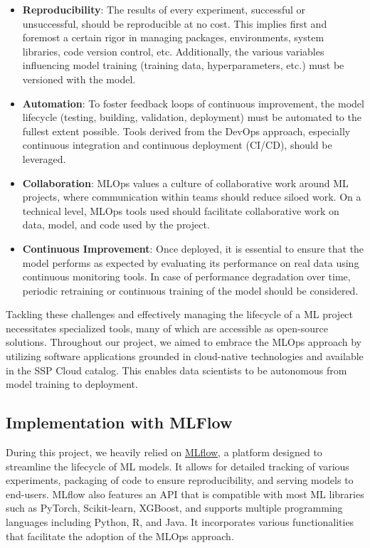 \begin{itemize}
    \item \textbf{Reproducibility}: The results of every experiment, successful or unsuccessful, should be reproducible at no cost. This implies first and foremost a certain rigor in managing packages, environments, system libraries, code version control, etc. Additionally, the various variables influencing model training (training data, hyperparameters, etc.) must be versioned with the model.
    
    \item \textbf{Automation}: To foster feedback loops of continuous improvement, the model lifecycle (testing, building, validation, deployment) must be automated to the fullest extent possible. Tools derived from the DevOps approach, especially continuous integration and continuous deployment (CI/CD), should be leveraged.
    
    \item \textbf{Collaboration}: MLOps values a culture of collaborative work around ML projects, where communication within teams should reduce siloed work. On a technical level, MLOps tools used should facilitate collaborative work on data, model, and code used by the project.
    
    \item \textbf{Continuous Improvement}: Once deployed, it is essential to ensure that the model performs as expected by evaluating its performance on real data using continuous monitoring tools. In case of performance degradation over time, periodic retraining or continuous training of the model should be considered.
\end{itemize}


Tackling these challenges and effectively managing the lifecycle of a ML project necessitates specialized tools, many of which are accessible as open-source solutions. Throughout our project, we aimed to embrace the MLOps approach by utilizing software applications grounded in cloud-native technologies and available in the SSP Cloud catalog. This enables data scientists to be autonomous from model training to deployment.

\subsection{Implementation with MLFlow}

During this project, we heavily relied on \href{https://github.com/MLflow/MLflow}{MLflow}, a platform designed to streamline the lifecycle of ML models. It allows for detailed tracking of various experiments, packaging of code to ensure reproducibility, and serving models to end-users. MLflow also features an API that is compatible with most ML libraries such as PyTorch, Scikit-learn, XGBoost, and supports multiple programming languages including Python, R, and Java. It incorporates various functionalities that facilitate the adoption of the MLOps approach.


